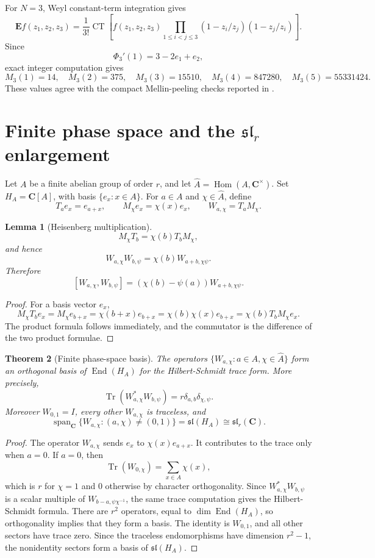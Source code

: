 \documentclass[11pt]{article}
\newcommand{\C}{\mathbf C}
\newcommand{\Tr}{\operatorname{Tr}}
\newcommand{\End}{\operatorname{End}}
\newcommand{\Hom}{\operatorname{Hom}}
\newcommand{\Span}{\operatorname{span}}
\theoremstyle{plain}
\newtheorem{theorem}{Theorem}[section]
\newtheorem{lemma}[theorem]{Lemma}
\theoremstyle{definition}
\numberwithin{equation}{section}
\begin{document}
For \(N=3\), Weyl constant-term integration gives
\[
 \mathbf E f(z_1,z_2,z_3)=\frac1{3!}\operatorname{CT}\left[f(z_1,z_2,z_3)
 \prod_{1\le i<j\le3}(1-z_i/z_j)(1-z_j/z_i)\right].
\]
Since
\[
 \Phi_3'(1)=3-2e_1+e_2,
\]
exact integer computation gives
\[
 M_3(1)=14,
 \quad
 M_3(2)=375,
 \quad
 M_3(3)=15510,
 \quad
 M_3(4)=847280,
 \quad
 M_3(5)=55331424.
\]
These values agree with the compact Mellin-peeling checks reported in \cite{CUEPeeling}.

\section{Finite phase space and the \(\mathfrak{sl}_r\) enlargement}\label{sec:phase}

Let \(A\) be a finite abelian group of order \(r\), and let \(\widehat A=\Hom(A,\C^\times)\).  Set \(H_A=\C[A]\), with basis \(\{e_x:x\in A\}\).  For \(a\in A\) and \(\chi\in\widehat A\), define
\[
 T_ae_x=e_{a+x},
 \qquad
 M_\chi e_x=\chi(x)e_x,
 \qquad
 W_{a,\chi}=T_aM_\chi.
\]

\begin{lemma}[Heisenberg multiplication]
\[
 M_\chi T_b=\chi(b)T_bM_\chi,
\]
and hence
\[
 W_{a,\chi}W_{b,\psi}=\chi(b)W_{a+b,\chi\psi}.
\]
Therefore
\[
 [W_{a,\chi},W_{b,\psi}]=(\chi(b)-\psi(a))W_{a+b,\chi\psi}.
\]
\end{lemma}

\begin{proof}
For a basis vector \(e_x\),
\[
 M_\chi T_b e_x=M_\chi e_{b+x}=\chi(b+x)e_{b+x}=\chi(b)\chi(x)e_{b+x}=\chi(b)T_bM_\chi e_x.
\]
The product formula follows immediately, and the commutator is the difference of the two product formulae.
\end{proof}

\begin{theorem}[Finite phase-space basis]\label{thm:phase-space}
The operators \(\{W_{a,\chi}:a\in A,\chi\in\widehat A\}\) form an orthogonal basis of \(\End(H_A)\) for the Hilbert-Schmidt trace form.  More precisely,
\[
 \Tr(W_{a,\chi}^*W_{b,\psi})=r\delta_{a,b}\delta_{\chi,\psi}.
\]
Moreover \(W_{0,1}=I\), every other \(W_{a,\chi}\) is traceless, and
\[
 \Span_{\C}\{W_{a,\chi}:(a,\chi)\ne(0,1)\}=\mathfrak{sl}(H_A)\cong\mathfrak{sl}_r(\C).
\]
\end{theorem}

\begin{proof}
The operator \(W_{a,\chi}\) sends \(e_x\) to \(\chi(x)e_{a+x}\).  It contributes to the trace only when \(a=0\).  If \(a=0\), then
\[
 \Tr(W_{0,\chi})=\sum_{x\in A}\chi(x),
\]
which is \(r\) for \(\chi=1\) and \(0\) otherwise by character orthogonality.  Since \(W_{a,\chi}^*W_{b,\psi}\) is a scalar multiple of \(W_{b-a,\psi\chi^{-1}}\), the same trace computation gives the Hilbert-Schmidt formula.  There are \(r^2\) operators, equal to \(\dim\End(H_A)\), so orthogonality implies that they form a basis.  The identity is \(W_{0,1}\), and all other sectors have trace zero.  Since the traceless endomorphisms have dimension \(r^2-1\), the nonidentity sectors form a basis of \(\mathfrak{sl}(H_A)\).
\end{proof}
\end{document}

